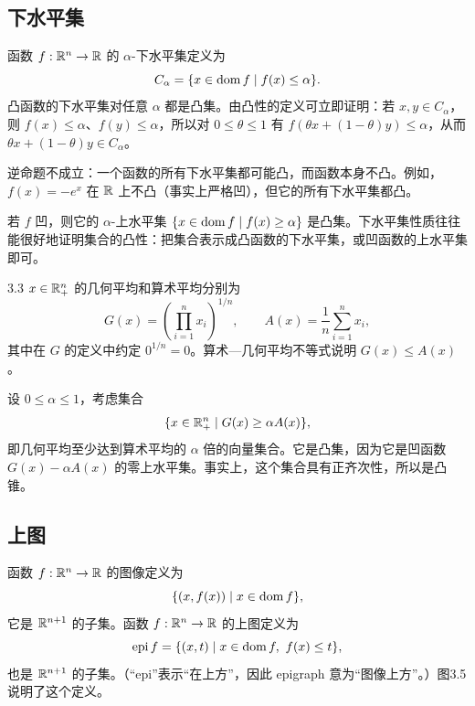 \subsection{下水平集}
函数 $f:\mathbb R^n\to\mathbb R$ 的 $\alpha$-下水平集定义为
\[C_\alpha=\{x\in\operatorname{dom} f\mid f(x)\leq\alpha\}.\]
凸函数的下水平集对任意 $\alpha$ 都是凸集。由凸性的定义可立即证明：若 $x,y\in C_\alpha$，则 $f(x)\leq\alpha$、$f(y)\leq\alpha$，所以对 $0\leq\theta\leq1$ 有 $f(\theta x+(1-\theta)y)\leq\alpha$，从而 $\theta x+(1-\theta)y\in C_\alpha$。

逆命题不成立：一个函数的所有下水平集都可能凸，而函数本身不凸。例如，$f(x)=-e^x$ 在 $\mathbb R$ 上不凸（事实上严格凹），但它的所有下水平集都凸。

若 $f$ 凹，则它的 $\alpha$-上水平集 $\{x\in\operatorname{dom} f\mid f(x)\geq\alpha\}$ 是凸集。下水平集性质往往能很好地证明集合的凸性：把集合表示成凸函数的下水平集，或凹函数的上水平集即可。
\begin{origexample}{3.3}
$x\in\mathbb R_+^n$ 的几何平均和算术平均分别为
\[G(x)=\left(\prod_{i=1}^n x_i\right)^{1/n},\qquad A(x)=\frac1n\sum_{i=1}^n x_i,\]
其中在 $G$ 的定义中约定 $0^{1/n}=0$。算术—几何平均不等式说明 $G(x)\leq A(x)$。

设 $0\leq\alpha\leq1$，考虑集合
\[\{x\in\mathbb R_+^n\mid G(x)\geq\alpha A(x)\},\]
即几何平均至少达到算术平均的 $\alpha$ 倍的向量集合。它是凸集，因为它是凹函数 $G(x)-\alpha A(x)$ 的零上水平集。事实上，这个集合具有正齐次性，所以是凸锥。
\end{origexample}
\subsection{上图}
函数 $f:\mathbb R^n\to\mathbb R$ 的图像定义为
\[\{(x,f(x))\mid x\in\operatorname{dom} f\},\]
它是 $\mathbb R^{n+1}$ 的子集。函数 $f:\mathbb R^n\to\mathbb R$ 的上图定义为
\[\operatorname{epi} f=\{(x,t)\mid x\in\operatorname{dom} f,\ f(x)\leq t\},\]
也是 $\mathbb R^{n+1}$ 的子集。（“epi”表示“在上方”，因此 epigraph 意为“图像上方”。）图3.5说明了这个定义。

